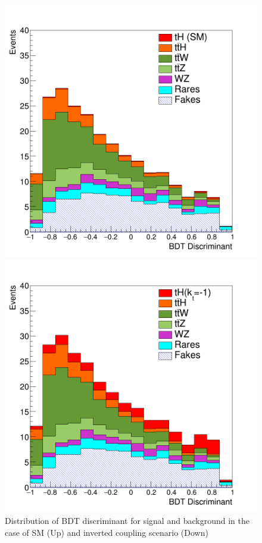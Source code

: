 \begin{figure}[ht]
	\centering
	\begin{minipage}[b]{0.6\textwidth}
		\includegraphics[width=\textwidth]{Chapter3/kos.png}
	\end{minipage}
	\hfill
	\begin{minipage}[b]{0.6\textwidth}
		\includegraphics[width=\textwidth]{Chapter3/kos2.png}
	\end{minipage}
\caption[Distribution of BDT for signal and backgrounds ]{Distribution of BDT discriminant for signal and background in the case of SM (Up) and inverted coupling scenario (Down) \cite{th1}}
\label{bdt2}
\end{figure}

